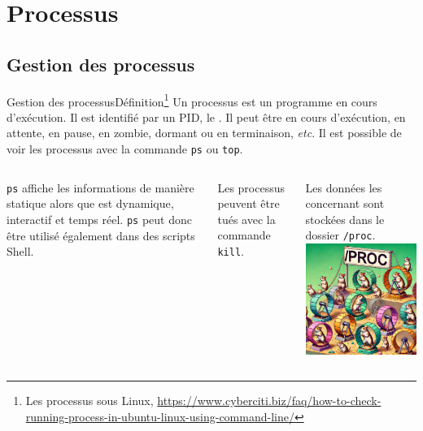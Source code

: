 \documentclass{beamer}
\begin{document}
    \section{Processus}\label{sec:processus}

    \subsection{Gestion des processus}\label{subsec:process-management}

    \begin{frame}{Gestion des processus}{Définition\footnote{\label{process}Les processus sous Linux, \url{https://www.cyberciti.biz/faq/how-to-check-running-process-in-ubuntu-linux-using-command-line/}}}
        Un processus est un programme en cours d'exécution.
        Il est identifié par un PID, le .
        \bigbreak
        Il peut être en cours d'exécution, en attente, en pause, en zombie, dormant ou en terminaison, \textit{etc}.
        Il est possible de voir les processus avec la commande \lstinline{ps} ou \lstinline{top}.
        \bigbreak
        \begin{columns}
            \lstinline{ps} affiche les informations de manière statique alors que est dynamique, interactif et temps réel.
            \lstinline{ps} peut donc être utilisé également dans des scripts Shell.

            Les processus peuvent être tués avec la commande \lstinline{kill}.

            Les données les concernant sont stockées dans le dossier \lstinline{/proc}.
            \centering
            \includegraphics[width=4cm]{image/proc-hamster}
        \end{columns}
    \end{frame}
\end{document}
